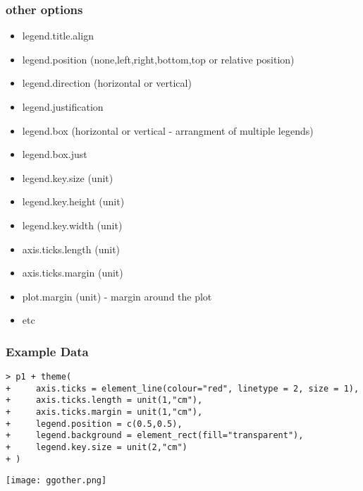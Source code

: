 \begin{frame}[allowframebreaks]\frametitle{other options}
  \begin{itemize}
  \item legend.title.align 
  \item legend.position (none,left,right,bottom,top or relative position)
  \item legend.direction (horizontal or vertical)
  \item legend.justification
  \item legend.box (horizontal or vertical - arrangment of multiple legends)
  \item legend.box.just
  \item legend.key.size (unit)
  \item legend.key.height (unit)
  \item legend.key.width (unit)
  \item axis.ticks.length (unit)
  \item axis.ticks.margin (unit)
  \item plot.margin (unit) - margin around the plot
  \item etc
  \end{itemize}
\end{frame}


\begin{frame}\frametitle{Example Data}
\scriptsize
\begin{verbatim}
> p1 + theme(
+     axis.ticks = element_line(colour="red", linetype = 2, size = 1),
+     axis.ticks.length = unit(1,"cm"),
+     axis.ticks.margin = unit(1,"cm"),
+     legend.position = c(0.5,0.5),
+     legend.background = element_rect(fill="transparent"),
+     legend.key.size = unit(2,"cm")
+ )
\end{verbatim}
  \begin{center}
    \texttt{[image: ggother.png]}
  \end{center}
\end{frame}

